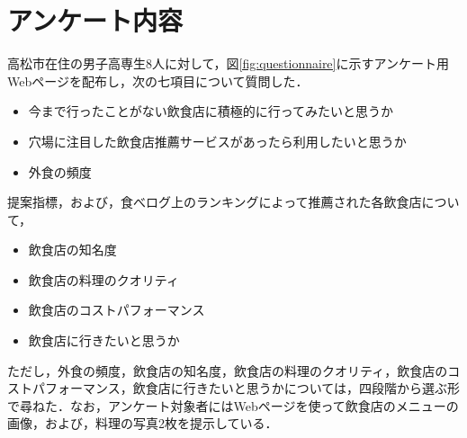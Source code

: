 \section{アンケート内容}\label{exp:questionnaire}

高松市在住の男子高専生8人に対して，図\ref{fig:questionnaire}に示すアンケート用Webページを配布し，次の七項目について質問した．
	\begin{itemize}
		\item 今まで行ったことがない飲食店に積極的に行ってみたいと思うか
		\item 穴場に注目した飲食店推薦サービスがあったら利用したいと思うか
		\item 外食の頻度
	\end{itemize}
	提案指標，および，食べログ上のランキングによって推薦された各飲食店について，
	\begin{itemize}
		\item 飲食店の知名度
		\item 飲食店の料理のクオリティ
		\item 飲食店のコストパフォーマンス
		\item 飲食店に行きたいと思うか
	\end{itemize}
	ただし，外食の頻度，飲食店の知名度，飲食店の料理のクオリティ，飲食店のコストパフォーマンス，飲食店に行きたいと思うかについては，四段階から選ぶ形で尋ねた．なお，アンケート対象者にはWebページを使って飲食店のメニューの画像，および，料理の写真2枚を提示している．

